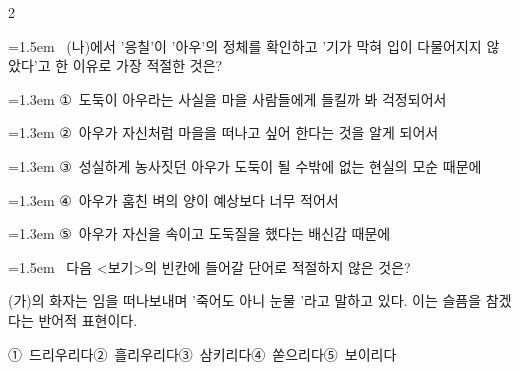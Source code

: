 \documentclass[10pt, a4paper]{article}
\begin{document}
\begin{multicols}{2}
\noindent\begin{minipage}{\columnwidth}
\vspace{2mm}
{\hangindent=1.5em  ~(나)에서 '응칠'이 '아우'의 정체를 확인하고 '기가 막혀 입이 다물어지지 않았다'고 한 이유로 가장 적절한 것은?\par}

\vspace{0.5mm}
{\hangindent=1.3em  \noindent\hspace{0.3em}①~도둑이 아우라는 사실을 마을 사람들에게 들킬까 봐 걱정되어서\par}
{\hangindent=1.3em  \noindent\hspace{0.3em}②~아우가 자신처럼 마을을 떠나고 싶어 한다는 것을 알게 되어서\par}
{\hangindent=1.3em  \noindent\hspace{0.3em}③~성실하게 농사짓던 아우가 도둑이 될 수밖에 없는 현실의 모순 때문에\par}
{\hangindent=1.3em  \noindent\hspace{0.3em}④~아우가 훔친 벼의 양이 예상보다 너무 적어서\par}
{\hangindent=1.3em  \noindent\hspace{0.3em}⑤~아우가 자신을 속이고 도둑질을 했다는 배신감 때문에\par}
\vspace{4mm}
\end{minipage}
\par

\noindent\begin{minipage}{\columnwidth}
\vspace{2mm}
{\hangindent=1.5em  ~다음 <보기>의 빈칸에 들어갈 단어로 적절하지 않은 것은?\par}

\vspace{1mm}
\begin{boxibox}
(가)의 화자는 임을 떠나보내며 '죽어도 아니 눈물 \underline{\hspace{3cm}}'라고 말하고 있다. 이는 슬픔을 참겠다는 반어적 표현이다. \\
\end{boxibox}
\vspace{1mm}

\vspace{0.5mm}
\noindent
\mbox{①~드리우리다}\hspace{1em}\mbox{②~흘리우리다}\hspace{1em}\mbox{③~삼키리다}\hspace{1em}\mbox{④~쏟으리다}\hspace{1em}\mbox{⑤~보이리다}


\end{minipage}
\end{multicols}
\end{document}
